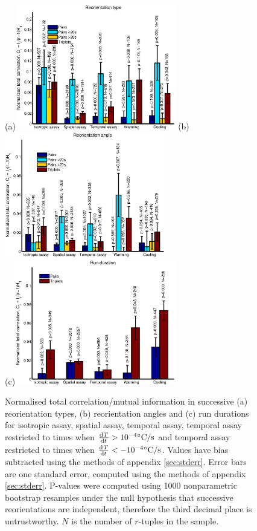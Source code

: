 \documentclass[12pt]{article}
\begin{document}
\begin{figure}
  \begin{center}
    (a)\includegraphics[width=7cm]{reotype.eps}
    (b)\includegraphics[width=7cm]{reoangle.eps}\\
    (c)\includegraphics[width=7cm]{rundur.eps}
  \end{center}
  \caption{Normalised total correlation/mutual information in successive (a) reorientation types, (b) reorientation angles and (c) run durations for isotropic assay, spatial assay, temporal assay, temporal assay restricted to times when $\diff{T}{t} > 10^{-4}\mbox{}\dC/\mathrm{s}$ and temporal assay restricted to times when $\diff{T}{t} < -10^{-4}\mbox{}\dC/\mathrm{s}$. Values have bias subtracted using the methods of appendix \ref{sec:stderr}. Error bars are one standard error, computed using the methods of appendix \ref{sec:stderr}. P-values were computed using 1000 nonparametric bootstrap resamples under the null hypothesis that successive reorientations are independent, therefore the third decimal place is untrustworthy. $N$ is the number of $r$-tuples in the sample.} \label{fig:results}
\end{figure}
\end{document}
